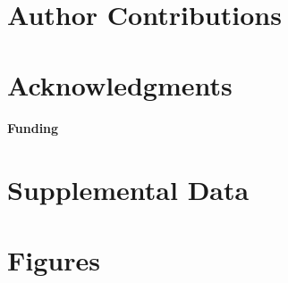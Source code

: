 \documentclass{frontiersSCNS}
\begin{document}

\section*{Author Contributions}



\section*{Acknowledgments}

\paragraph{Funding\textcolon} %

\section*{Supplemental Data}




\section*{Figures}
\end{document}
